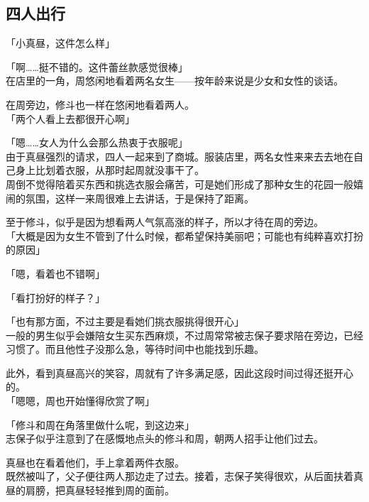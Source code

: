 \subsection{四人出行}

「小真昼，这件怎么样」

「啊……挺不错的。这件蕾丝款感觉很棒」\\

在店里的一角，周悠闲地看着两名女生——按年龄来说是少女和女性的谈话。

在周旁边，修斗也一样在悠闲地看着两人。\\

「两个人看上去都很开心啊」

「嗯……女人为什么会那么热衷于衣服呢」\\

由于真昼强烈的请求，四人一起来到了商城。服装店里，两名女性来来去去地在自己身上比划着衣服，从那时起周就没事干了。\\

周倒不觉得陪着买东西和挑选衣服会痛苦，可是她们形成了那种女生的花园一般嬉闹的氛围，这样一来周很难上去讲话，于是保持了距离。

至于修斗，似乎是因为想看两人气氛高涨的样子，所以才待在周的旁边。\\

「大概是因为女生不管到了什么时候，都希望保持美丽吧；可能也有纯粹喜欢打扮的原因」

「嗯，看着也不错啊」

「看打扮好的样子？」

「也有那方面，不过主要是看她们挑衣服挑得很开心」\\

一般的男生似乎会嫌陪女生买东西麻烦，不过周常常被志保子要求陪在旁边，已经习惯了。而且他性子没那么急，等待时间中也能找到乐趣。

此外，看到真昼高兴的笑容，周就有了许多满足感，因此这段时间过得还挺开心的。\\

「嗯嗯，周也开始懂得欣赏了啊」

「修斗和周在角落里做什么呢，到这边来」\\

志保子似乎注意到了在感慨地点头的修斗和周，朝两人招手让他们过去。

真昼也在看着他们，手上拿着两件衣服。\\

既然被叫了，父子便往两人那边走了过去。接着，志保子笑得很欢，从后面扶着真昼的肩膀，把真昼轻轻推到周的面前。\\

